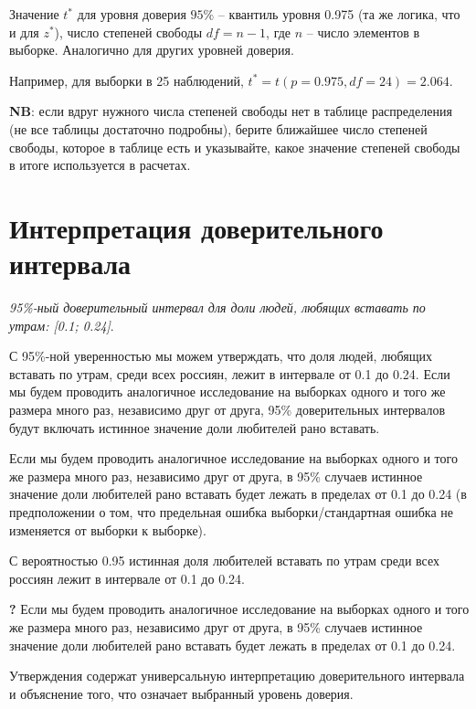 \documentclass[a4paper,12pt]{extarticle}
\newcommand{\xmark}{\ding{55}}
\begin{document}
Значение $t^*$ для уровня доверия $95\%$ -- квантиль уровня 0.975 
(та же логика, что и для $z^*$), число степеней свободы $df=n-1$, где 
$n$ -- число элементов в выборке. Аналогично для других уровней 
доверия.

Например, для выборки в 25 наблюдений, 
$t^*=t(p=0.975, df=24)=2.064$.

\textbf{NB}: если вдруг нужного числа степеней свободы нет в 
таблице распределения (не все таблицы достаточно подробны), 
берите ближайшее число степеней свободы, которое в таблице 
есть и указывайте, какое значение степеней свободы в итоге 
используется в расчетах.

\section*{Интерпретация доверительного интервала}
\textit{95\%-ный доверительный интервал для доли людей, 
любящих вставать по утрам: [0.1; 0.24]}. 

{\color{applegreen}\Large{\checkmark}} \normalsize С 95\%-ной 
уверенностью мы можем утверждать, что доля людей, любящих 
вставать по утрам, среди всех россиян, лежит в интервале от 
0.1 до 0.24. Если мы будем проводить аналогичное исследование 
на выборках одного и того же размера много раз, независимо друг 
от друга, 95\% доверительных интервалов будут включать истинное 
значение доли любителей рано вставать. 

{\color{applegreen}\Large{\checkmark}} \normalsize Если мы будем 
проводить аналогичное исследование на выборках одного и того 
же размера много раз, независимо друг от друга, в 95\% случаев 
истинное значение доли любителей рано вставать будет лежать в 
пределах от 0.1 до 0.24 (в предположении о том, что предельная 
ошибка выборки/стандартная ошибка не изменяется от выборки к 
выборке). 

{\color{red}\Large{\xmark}} \normalsize С вероятностью 0.95 истинная 
доля любителей вставать по утрам среди всех россиян лежит в 
интервале от 0.1 до 0.24. 

{\color{blue}\Large{\textbf{?}}} \normalsize Если мы будем проводить 
аналогичное исследование на выборках одного и того же размера 
много раз, независимо друг от друга, в 95\% случаев истинное 
значение доли любителей рано вставать будет лежать в пределах 
от 0.1 до 0.24. \medskip\\


Утверждения содержат универсальную интерпретацию доверительного 
интервала и объяснение того, что означает выбранный уровень доверия.\medskip\\
\end{document}
